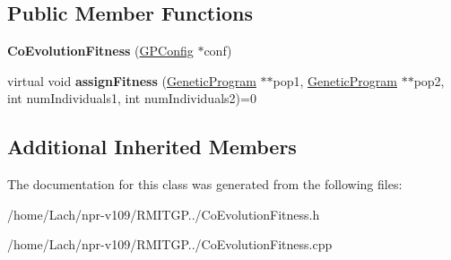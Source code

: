 \subsection*{Public Member Functions}
\begin{DoxyCompactItemize}
\item 
\hypertarget{classCoEvolutionFitness_a555a6571bc8d63f197904135e56ac8db}{}\label{classCoEvolutionFitness_a555a6571bc8d63f197904135e56ac8db} 
{\bfseries Co\+Evolution\+Fitness} (\hyperlink{classGPConfig}{G\+P\+Config} $\ast$conf)
\item 
\hypertarget{classCoEvolutionFitness_a37662009bec754e555bd536803d5204c}{}\label{classCoEvolutionFitness_a37662009bec754e555bd536803d5204c} 
virtual void {\bfseries assign\+Fitness} (\hyperlink{classGeneticProgram}{Genetic\+Program} $\ast$$\ast$pop1, \hyperlink{classGeneticProgram}{Genetic\+Program} $\ast$$\ast$pop2, int num\+Individuals1, int num\+Individuals2)=0
\end{DoxyCompactItemize}
\subsection*{Additional Inherited Members}


The documentation for this class was generated from the following files\+:\begin{DoxyCompactItemize}
\item 
/home/\+Lach/npr-\/v109/\+R\+M\+I\+T\+G\+P../Co\+Evolution\+Fitness.\+h\item 
/home/\+Lach/npr-\/v109/\+R\+M\+I\+T\+G\+P../Co\+Evolution\+Fitness.\+cpp\end{DoxyCompactItemize}
